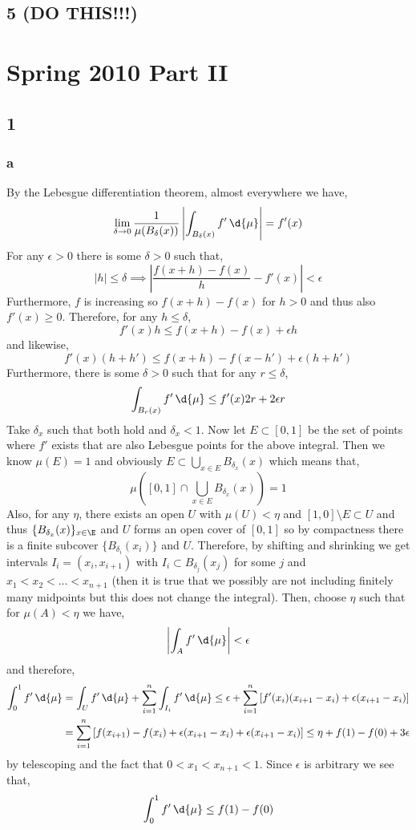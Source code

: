 \documentclass[12pt]{article}
\begin{document}
\subsection{5 (DO THIS!!!)}

\section{Spring 2010 Part II}

\subsection{1}

\subsubsection{a}

By the Lebesgue differentiation theorem, almost everywhere we have,
\[ \lim_{\delta \to 0} \frac{1}{\mu(B_\delta(x))} \left| \int_{B_\delta(x)} f' \, \d{\mu} \right| = f'(x) \]
For any $\epsilon > 0$ there is some $\delta > 0$ such that,
\[ |h| \le \delta \implies \left| \frac{f(x + h) - f(x)}{h} - f'(x) \right| < \epsilon \]
Furthermore, $f$ is increasing so $f(x+h) - f(x)$ for $h > 0$ and thus also $f'(x) \ge 0$. Therefore, for any $h \le \delta$,
\[ f'(x) h \le f(x + h) - f(x) + \epsilon h \]
and likewise,
\[ f'(x) (h + h') \le f(x + h) - f(x - h') + \epsilon (h + h') \] 
Furthermore, there is some $\delta > 0$ such that for any $r \le \delta$,
\[ \int_{B_r(x)} f' \, \d{\mu} \le f'(x) 2r + 2 \epsilon r \]
Take $\delta_x$ such that both hold and $\delta_x < 1$. Now let $E \subset [0,1]$ be the set of points where $f'$ exists that are also Lebesgue points for the above integral. Then we know $\mu(E) = 1$ and obviously $E \subset \bigcup_{x \in E} B_{\delta_x}(x)$ which means that,
\[ \mu \left( [0, 1] \cap \bigcup_{x \in E} B_{\delta_x}(x) \right) = 1 \]
Also, for any $\eta$, there exists an open $U$ with $\mu(U) < \eta$ and $[1, 0] \setminus E \subset U$ and thus $\{ B_{\delta_x}(x) \}_{x \in \E}$ and $U$ forms an open cover of $[0,1]$ so by compactness there is a finite subcover $\{ B_{\delta_i}(x_i) \}$ and $U$. Therefore, by shifting and shrinking we get intervals $I_i = (x_i, x_{i+1})$ with $I_i \subset B_{\delta_j}(x_j)$ for some $j$ and $x_1 < x_2 < \dots < x_{n+1}$ (then it is true that we possibly are not including finitely many midpoints but this does not change the integral). Then, choose $\eta$ such that for $\mu(A) < \eta$ we have,
\[ \left| \int_A f' \, \d{\mu} \right| < \epsilon \]
and therefore,
\begin{align*}
\int_0^1 f' \, \d{\mu} & = \int_U f' \, \d{\mu} + \sum_{i = 1}^n \int_{I_i} f' \, \d{\mu} \le \epsilon + \sum_{i = 1}^n \left[ f'(x_i) (x_{i+1} - x_i) + \epsilon (x_{i + 1} - x_i) \right]
\\
& = \sum_{i = 1}^n \left[ f(x_{i+1}) - f(x_i) +  \epsilon (x_{i + 1} - x_i) + \epsilon (x_{i + 1} - x_i) \right] \le \eta + f(1) - f(0) + 3 \epsilon 
\end{align*}
by telescoping and the fact that $0 < x_1 < x_{n+1} < 1$. Since $\epsilon$ is arbitrary we see that,
\[ \int_0^1 f' \, \d{\mu} \le f(1) - f(0) \]
\end{document}
